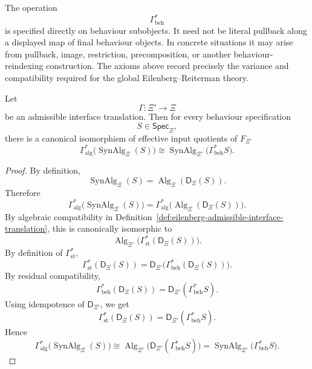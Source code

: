 \begin{remark}[Variance]
\label{rem:eilenberg-admissible-translation-variance}
The operation
\[
\Gamma_{\mathrm{beh}}^\ast
\]
is specified directly on behaviour subobjects. It need not be literal
pullback along a displayed map of final behaviour objects. In concrete
situations it may arise from pullback, image, restriction, precomposition, or
another behaviour-reindexing construction. The axioms above record precisely
the variance and compatibility required for the global Eilenberg--Reiterman
theory.
\end{remark}

\begin{proposition}
\label{prop:eilenberg-synalg-commutes-with-translations}
Let
\[
\Gamma:\Xi'\to\Xi
\]
be an admissible interface translation. Then for every behaviour
specification
\[
S\in\mathsf{Spec}_{\Xi},
\]
there is a canonical isomorphism of effective input quotients of \(F_{\Xi'}\)
\[
\Gamma_{\mathrm{alg}}^\ast
\bigl(
\operatorname{SynAlg}_{\Xi}(S)
\bigr)
\cong
\operatorname{SynAlg}_{\Xi'}
\bigl(
\Gamma_{\mathrm{beh}}^\ast S
\bigr).
\]
\end{proposition}

\begin{proof}
By definition,
\[
\operatorname{SynAlg}_{\Xi}(S)
=
\operatorname{Alg}_{\Xi}(\mathsf D_\Xi(S)).
\]
Therefore
\[
\Gamma_{\mathrm{alg}}^\ast
\bigl(
\operatorname{SynAlg}_{\Xi}(S)
\bigr)
=
\Gamma_{\mathrm{alg}}^\ast
\bigl(
\operatorname{Alg}_{\Xi}(\mathsf D_\Xi(S))
\bigr).
\]
By algebraic compatibility in
Definition~\ref{def:eilenberg-admissible-interface-translation}, this is
canonically isomorphic to
\[
\operatorname{Alg}_{\Xi'}
\bigl(
\Gamma_{\mathrm{st}}^\ast(\mathsf D_\Xi(S))
\bigr).
\]
By definition of \(\Gamma_{\mathrm{st}}^\ast\),
\[
\Gamma_{\mathrm{st}}^\ast(\mathsf D_\Xi(S))
=
\mathsf D_{\Xi'}
\bigl(
\Gamma_{\mathrm{beh}}^\ast(\mathsf D_\Xi(S))
\bigr).
\]
By residual compatibility,
\[
\Gamma_{\mathrm{beh}}^\ast(\mathsf D_\Xi(S))
=
\mathsf D_{\Xi'}(\Gamma_{\mathrm{beh}}^\ast S).
\]
Using idempotence of \(\mathsf D_{\Xi'}\), we get
\[
\Gamma_{\mathrm{st}}^\ast(\mathsf D_\Xi(S))
=
\mathsf D_{\Xi'}(\Gamma_{\mathrm{beh}}^\ast S).
\]
Hence
\[
\Gamma_{\mathrm{alg}}^\ast
\bigl(
\operatorname{SynAlg}_{\Xi}(S)
\bigr)
\cong
\operatorname{Alg}_{\Xi'}
\bigl(
\mathsf D_{\Xi'}(\Gamma_{\mathrm{beh}}^\ast S)
\bigr)
=
\operatorname{SynAlg}_{\Xi'}
\bigl(
\Gamma_{\mathrm{beh}}^\ast S
\bigr).
\]
\end{proof}

